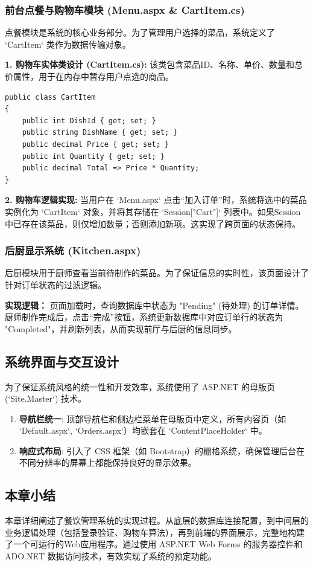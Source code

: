 \documentclass[11pt, a4paper]{article}
\begin{document}
\subsubsection{前台点餐与购物车模块 (Menu.aspx \& CartItem.cs)}
点餐模块是系统的核心业务部分。为了管理用户选择的菜品，系统定义了 `CartItem` 类作为数据传输对象。

\textbf{1. 购物车实体类设计 (CartItem.cs):}
该类包含菜品ID、名称、单价、数量和总价属性，用于在内存中暂存用户点选的商品。

\begin{lstlisting}[language={[Sharp]C}, caption={CartItem类定义}, label={code:cartitem}]
public class CartItem
{
    public int DishId { get; set; }
    public string DishName { get; set; }
    public decimal Price { get; set; }
    public int Quantity { get; set; }
    public decimal Total => Price * Quantity;
}
\end{lstlisting}

\textbf{2. 购物车逻辑实现:}
当用户在 `Menu.aspx` 点击“加入订单”时，系统将选中的菜品实例化为 `CartItem` 对象，并将其存储在 `Session["Cart"]` 列表中。如果Session中已存在该菜品，则仅增加数量；否则添加新项。这实现了跨页面的状态保持。

\subsubsection{后厨显示系统 (Kitchen.aspx)}
后厨模块用于厨师查看当前待制作的菜品。为了保证信息的实时性，该页面设计了针对订单状态的过滤逻辑。

\textbf{实现逻辑：}
页面加载时，查询数据库中状态为 "Pending" (待处理) 的订单详情。厨师制作完成后，点击“完成”按钮，系统更新数据库中对应订单行的状态为 "Completed"，并刷新列表，从而实现前厅与后厨的信息同步。

\subsection{系统界面与交互设计}
为了保证系统风格的统一性和开发效率，系统使用了 ASP.NET 的母版页 (`Site.Master`) 技术。

\begin{enumerate}
    \item \textbf{导航栏统一}: 顶部导航栏和侧边栏菜单在母版页中定义，所有内容页（如 `Default.aspx`, `Orders.aspx`）均嵌套在 `ContentPlaceHolder` 中。
    \item \textbf{响应式布局}: 引入了 CSS 框架（如 Bootstrap）的栅格系统，确保管理后台在不同分辨率的屏幕上都能保持良好的显示效果。
\end{enumerate}

\subsection{本章小结}
本章详细阐述了餐饮管理系统的实现过程。从底层的数据库连接配置，到中间层的业务逻辑处理（包括登录验证、购物车算法），再到前端的界面展示，完整地构建了一个可运行的Web应用程序。通过使用 ASP.NET Web Forms 的服务器控件和 ADO.NET 数据访问技术，有效实现了系统的预定功能。
\end{document}
